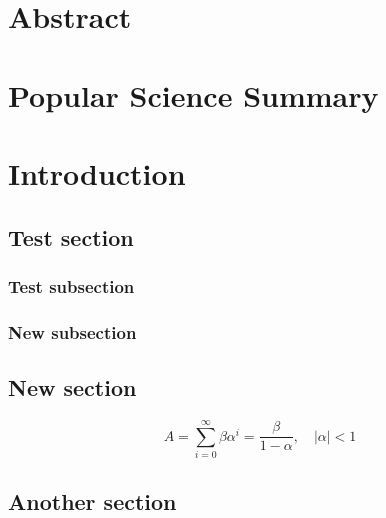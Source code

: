 \documentclass[11pt,twoside]{eitExjobb}
\begin{document}
\MakeTitlePage  %
\frontmatter    %
\chapter*{Abstract}
\lipsum[1-2]
\chapter*{Popular Science Summary}
\lipsum[3-7]
\tableofcontents
\listoffigures
\listoftables
\cleardoublepage
\mainmatter

\chapter{Introduction}
\lipsum[1]

\section{Test section}
\lipsum[2-4]

\subsection{Test subsection}
\lipsum[5]

\subsection{New subsection}
\lipsum[6]

\section{New section}
\lipsum[1]
\begin{displaymath}
  A=\sum_{i=0}^{\infty}\beta\alpha^i=\frac{\beta}{1-\alpha},\quad |\alpha|<1
\end{displaymath}
\lipsum[2]

\section{Another section}
\lipsum[3-6]
\end{document}
